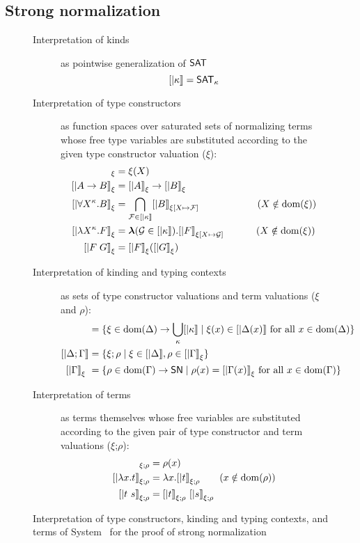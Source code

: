 \subsection*{Strong normalization}
\begin{figure}
\begin{singlespace}
\begin{description}
\item[Interpretation of kinds] as pointwise generalization of $\mathsf{SAT}$
	\[ [| \kappa |] = \mathsf{SAT}_\kappa \]
\item[Interpretation of type constructors]
	as function spaces over saturated sets of normalizing terms
	whose free type variables are substituted according to
	the given type constructor valuation ($\xi$):
\begin{align*}
[| X |]_\xi      &= \xi(X) \\ 
[| A -> B |]_\xi &= [|A|]_\xi -> [|B|]_\xi \\
[| \forall X^\kappa . B |]_\xi
	&= \bigcap_{\mathcal{F}\in[|\kappa|]} [|B|]_{\xi[X\mapsto\mathcal{F}]}
		\qquad\qquad\qquad (X\notin\dom(\xi)) \\
[| \l X^\kappa . F |]_\xi
	&= \bbl(\mathcal{G} \in [|\kappa|]) . [|F|]_{\xi[X\mapsto\mathcal{G}]}
		\qquad\quad~ (X\notin\dom(\xi)) \\
[| F \; G |]_\xi &= [|F|]_\xi ( [|G|]_\xi )
\end{align*}
\item[Interpretation of kinding and typing contexts]
	as sets of type constructor valuations and term valuations
	($\xi$ and $\rho$):
\begin{align*}
[| \Delta        |] &= \{ \xi \in \dom(\Delta) -> \bigcup_{\kappa} [|\kappa|] \mid \xi(x)\in[|\Delta(x)|] ~\text{for all}~x\in\dom(\Delta) \} \\
[| \Delta;\Gamma |] &= \{ \xi;\rho \mid \xi\in[|\Delta|], \rho\in[|\Gamma|]_\xi \} \\
[| \Gamma        |]_\xi\ &= \{ \rho \in \dom(\Gamma) -> \SN \mid \rho(x)=[|\Gamma(x)|]_\xi ~\text{for all}~x\in\dom(\Gamma) \}
\end{align*}
\item[Interpretation of terms]
	as terms themselves whose free variables are substituted according to
	the given pair of type constructor and term valuations
	($\xi$;$\rho$):
\begin{align*}
[| x      |]_{\xi;\rho} &= \rho(x) \\
[| \l x.t |]_{\xi;\rho} &= \l x . [|t|]_{\xi;\rho} \qquad (x\notin\dom(\rho)) \\
[| t ~ s  |]_{\xi;\rho} &= [| t |]_{\xi;\rho} ~ [| s |]_{\xi;\rho}
\end{align*}
\end{description}
\caption[Interpretation of System \Fw\ for proving strong normalization]
	{Interpretation of type constructors, kinding and typing contexts,
		and terms of System \Fw\ for the proof of strong normalization}
\label{fig:interpFw}
\end{singlespace}
\end{figure}
